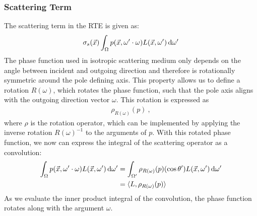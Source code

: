 \subsubsection*{Scattering Term}

The scattering term in the RTE is given as:
\begin{align*}
\sigma_s(\vec{x})\int_{\Omega}p(\vec{x}, \omega'\cdot\omega)L(\vec{x}, \omega')\,\mathrm{d}\omega'
\end{align*}
The phase function used in isotropic scattering medium only depends on the angle between incident and outgoing direction and therefore is rotationally symmetric around the pole defining axis. This property allows us to define a rotation $R(\omega)$, which rotates the phase function, such that the pole axis aligns with the outgoing direction vector $\omega$. This rotation is expressed as
\begin{align*}
\rho_{R(\omega)}(p)
\ ,
\end{align*}
where $\rho$ is the rotation operator, which can be implemented by applying the inverse rotation $R(\omega)^{-1}$ to the arguments of $p$. With this rotated phase function, we now can express the integral of the scattering operator as a convolution:
\begin{align}
\int_{\Omega}p(\vec{x}, \omega'\cdot\omega)L(\vec{x}, \omega')\,\mathrm{d}\omega'
&=
\int_{\Omega'}{\rho_{R(\omega)}(p)(\operatorname{cos}\theta')L(\vec{x}, \omega')\,\mathrm{d}\omega'}
\nonumber\\
&= \langle L,  \rho_{R(\omega)}(p)\rangle
\label{eq:complex_scatt_conv}
\end{align}
As we evaluate the inner product integral of the convolution, the phase function rotates along with the argument $\omega$.

